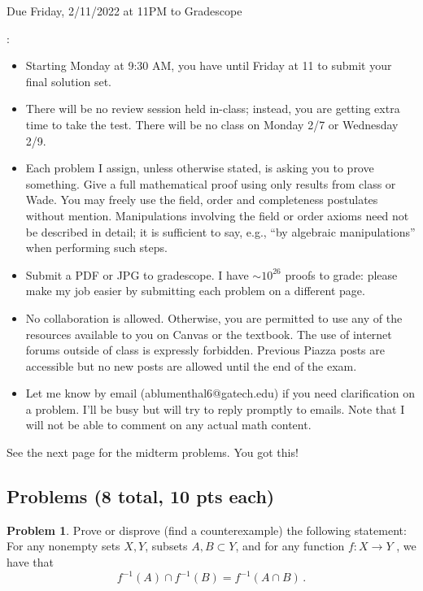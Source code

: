 \documentclass[11pt]{article}
\theoremstyle{definition}
\newtheorem{problem}{Problem}
\begin{document}
  \hfill Due Friday, 2/11/2022 at 11PM to Gradescope

\bigskip

: 
\begin{itemize}
\item Starting Monday at 9:30 AM, you have until Friday at 11 to submit your final solution set. 
\item There will be no review session held in-class; instead, you are getting extra time to take the test. There will be no class on Monday 2/7 or Wednesday 2/9.
\item Each problem I assign, unless otherwise stated, is asking you to prove something. Give a full mathematical proof using only results from class or Wade. You may freely use the field, order and completeness postulates without mention. Manipulations involving the field or order axioms need not be described in detail; it is sufficient to say, e.g.,  ``by algebraic manipulations'' when performing such steps. 
\item Submit a PDF or JPG to gradescope. I have $\sim 10^{26}$ proofs to grade:  please make my job easier by submitting each problem on a different page. 
\item No collaboration is allowed. Otherwise, you are permitted to use any of the resources available to you on Canvas or the textbook. The use of internet forums outside of class is expressly forbidden. Previous Piazza posts are accessible but no new posts are allowed until the end of the exam. 
\item Let me know by email (ablumenthal6@gatech.edu) if you need clarification on a problem. I'll be busy but will try to reply promptly to emails. Note that I will not be able to comment on any actual math content. 
\end{itemize}

See the next page for the midterm problems. You got this!

\newpage

\subsection*{Problems (8 total, 10 pts each)}
\begin{problem}
Prove or disprove (find a counterexample) the following statement: For any nonempty sets $X, Y$, subsets $A, B \subset Y$, and for any function $f : X \to Y$ , we have that 
\[f^{-1} (A) \cap f^{-1}(B) = f^{-1}(A \cap B) \,. \]
\end{problem}
\end{document}
